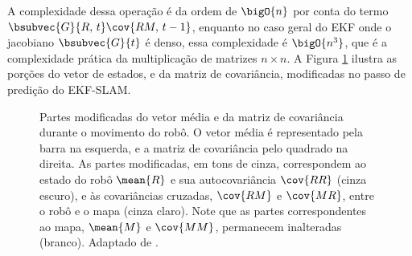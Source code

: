 \renewcommand{\arraystretch}{1.0}
A complexidade dessa operação é da ordem de $\bigO{n}$ por conta do termo $\bsubvec{G}{R,\, t} \cov{RM,\, t-1}$, enquanto no caso geral do EKF onde o jacobiano $\bsubvec{G}{t}$ é denso, essa complexidade é $\bigO{n^3}$, que é a complexidade prática da multiplicação de matrizes $n \times n$. A Figura 
\ref{fig:ekfslam-prediction} ilustra as porções do vetor de estados, e da 
matriz de covariância, modificadas no passo de predição do EKF-SLAM.

\begin{figure}[h]
  \centering
  
  \caption{Partes modificadas do vetor média e da matriz de covariância durante o movimento do robô. O vetor média é representado pela barra na esquerda, e a matriz de covariância pelo quadrado na direita. As partes modificadas, em tons de cinza, correspondem ao estado do robô $\mean{R}$  e sua autocovariância $\cov{RR}$ (cinza escuro), e às covariâncias cruzadas, $\cov{RM}$ e $\cov{MR}$, entre o robô e o mapa (cinza claro). Note que as partes correspondentes ao mapa, $\mean{M}$ e $\cov{MM}$, 
  permanecem inalteradas (branco). Adaptado de \cite[p.~10]{jsola}.}
  \label{fig:ekfslam-prediction}
\end{figure}



